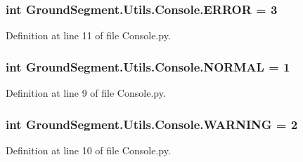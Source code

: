 \subsubsection[{E\+R\+R\+O\+R}]{\setlength{\rightskip}{0pt plus 5cm}int Ground\+Segment.\+Utils.\+Console.\+E\+R\+R\+O\+R = 3}\label{namespace_ground_segment_1_1_utils_1_1_console_a39783203a68f20c36bcd7b259f88e566}


Definition at line 11 of file Console.\+py.

\hypertarget{namespace_ground_segment_1_1_utils_1_1_console_a9e25c765b6540937c5954c92e0eb907c}{}
\subsubsection[{N\+O\+R\+M\+A\+L}]{\setlength{\rightskip}{0pt plus 5cm}int Ground\+Segment.\+Utils.\+Console.\+N\+O\+R\+M\+A\+L = 1}\label{namespace_ground_segment_1_1_utils_1_1_console_a9e25c765b6540937c5954c92e0eb907c}


Definition at line 9 of file Console.\+py.

\hypertarget{namespace_ground_segment_1_1_utils_1_1_console_a93ee0e75b3a841100230c1f02abb053e}{}
\subsubsection[{W\+A\+R\+N\+I\+N\+G}]{\setlength{\rightskip}{0pt plus 5cm}int Ground\+Segment.\+Utils.\+Console.\+W\+A\+R\+N\+I\+N\+G = 2}\label{namespace_ground_segment_1_1_utils_1_1_console_a93ee0e75b3a841100230c1f02abb053e}


Definition at line 10 of file Console.\+py.

